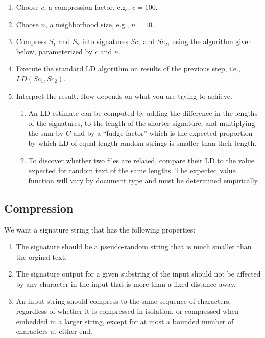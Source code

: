 \documentclass[html]{article}    %
\begin{document}
\begin{enumerate}
  	\item {Choose $c$, a compression factor, e.g., $c=100$.}
  	\item {Choose $n$, a neighborhood size, e.g., $n=10$.}
	\item {Compress $S_{1}$ and $S_{2}$ into signatures $Sc_{1}$ and $Sc_{2}$,
		using the algorithm given below, parameterized by $c$ and $n$.}
	\item {Execute the standard LD algorithm on results of the previous step, i.e.,
			$LD(Sc_{1},Sc_{2})$.}
	\item {Interpret the result. How depends on what you are trying to achieve. 
		\begin{enumerate}
			\item{An LD estimate can be computed by adding the difference in the lengths of the signatures, 
				to the length of the shorter signature, and  multiplying the sum by $C$ and by a ``fudge factor'' which is the expected
				proportion by which LD of equal-length random strings is smaller than their length.
			}	
			\item{ To discover whether two files are related, compare their LD to the value expected for random
				text of the same lengths.
				The expected value function will vary by document type and must be determined empirically.
			}	
		\end{enumerate}	
	}
\end{enumerate}

\subsection{Compression}
We want a signature string that has the following properties:
\begin{enumerate}
	\item {
		The signature should be a pseudo-random string that is much smaller than the orginal text.
	}
	\item{
		The signature output for a given substring of the input should not be affected by any character in the input that
		is more than a fixed distance away.  
	}
	\item{
		An input string should compress to the same sequence of characters, regardless of whether it is compressed in 
		isolation, or compressed when embedded in a larger string, except for at most a bounded number of 
		characters at either end.
		}
\end{enumerate}
\end{document}

